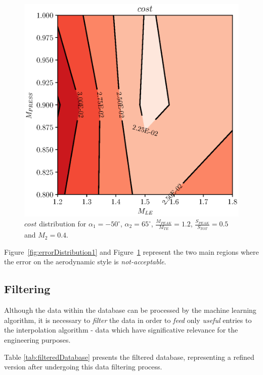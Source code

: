 \begin{figure}[H]
    \centering
    \includegraphics[scale=\scaleContour]{./images/costError2.eps}
    \caption{$cost$ distribution for $\alpha_1 = -50^{\circ}$, $\alpha_2 = 65^{\circ}$, $\frac{M_{PEAK}}{M_{TE}} = 1.2$, $\frac{S_{PEAK}}{S_{TOT}} = 0.5$ and $M_2 = 0.4$.}
    \label{fig:errorDistribution2}
\end{figure}

Figure~\ref{fig:errorDistribution1} and Figure~\ref{fig:errorDistribution2} represent the two main regions where 
the error on the aerodynamic style is \textit{not-acceptable}.

\subsection{Filtering}

Although the data within the database can be processed by the machine learning algorithm, it is necessary to 
\textit{filter} the data in order to \textit{feed} only \textit{useful} entries to the interpolation algorithm - data 
which have significative relevance for the engineering purposes.

Table \ref{tab:filteredDatabase} presents the filtered database, representing a refined version after undergoing this data filtering process.

